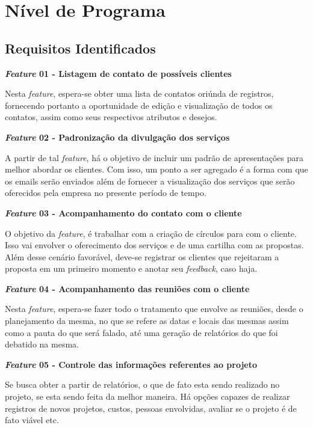 \chapter[Nível de Programa]{Nível de Programa}

\section{Requisitos Identificados}

\textbf{\textit{Feature} 01 - Listagem de contato de possíveis clientes}

Nesta \textit{feature}, espera-se obter uma lista de contatos oriúnda de registros, fornecendo portanto a oportunidade de edição e visualização de todos os contatos, assim como seus respectivos atributos e desejos.


\textbf{\textit{Feature} 02 - Padronização da divulgação dos serviços}

A partir de tal \textit{feature}, há o objetivo de incluir um padrão de apresentações para melhor abordar os clientes. Com isso, um ponto a ser agregado é a forma com que os emails serão enviados além de fornecer a visualização dos serviços que serão oferecidos pela empresa no presente período de tempo.


\textbf{\textit{Feature} 03 - Acompanhamento do contato com o cliente}

O objetivo da \textit{feature}, é trabalhar com a criação de círculos para com o cliente. Isso vai envolver o oferecimento dos serviços e de uma cartilha com as propostas. Além desse cenário favorável, deve-se registrar os clientes que rejeitaram a proposta em um primeiro momento e anotar seu \textit{feedback}, caso haja.


\textbf{\textit{Feature} 04 - Acompanhamento das reuniões com o cliente}

Nesta \textit{feature}, espera-se fazer todo o tratamento que envolve as reuniões, desde o planejamento da mesma, no que se refere as datas e locais das mesmas assim como a pauta do que será falado, até uma geração de relatórios do que foi debatido na mesma.		


\textbf{\textit{Feature} 05 - Controle das informações referentes ao projeto}

Se busca obter a partir de relatórios, o que de fato esta sendo realizado no projeto, se esta sendo feita da melhor maneira. Há opções capazes de realizar registros de novos projetos, custos, pessoas envolvidas, avaliar se o projeto é de fato viável etc.

